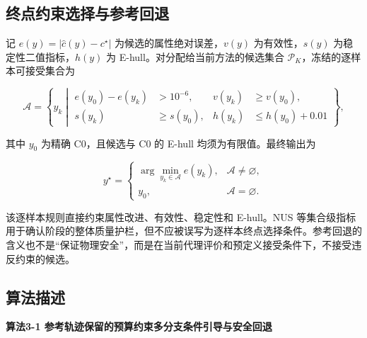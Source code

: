 \subsection{终点约束选择与参考回退}

记 \(e(y)=|\hat c(y)-c^{\star}|\) 为候选的属性绝对误差，\(v(y)\) 为有效性，\(s(y)\) 为稳定性二值指标，\(h(y)\) 为 E-hull。对分配给当前方法的候选集合 \(\mathcal P_K\)，冻结的逐样本可接受集合为

\[
\mathcal A=
\left\{y_k\middle|
\begin{aligned}
e(y_0)-e(y_k)&>10^{-6},&
v(y_k)&\ge v(y_0),\\
s(y_k)&\ge s(y_0),&
h(y_k)&\le h(y_0)+0.01
\end{aligned}
\right\},
\]

其中 \(y_0\) 为精确 C0，且候选与 C0 的 E-hull 均须为有限值。最终输出为

\[
y^{\star}=
\begin{cases}
\displaystyle\arg\min_{y_k\in\mathcal A}e(y_k), & \mathcal A\ne\varnothing,\\
y_0, & \mathcal A=\varnothing.
\end{cases}
\]

该逐样本规则直接约束属性改进、有效性、稳定性和 E-hull。NUS 等集合级指标用于确认阶段的整体质量护栏，但不应被误写为逐样本终点选择条件。参考回退的含义也不是``保证物理安全''，而是在当前代理评价和预定义接受条件下，不接受违反约束的候选。

\subsection{算法描述}

\textbf{算法3-1 参考轨迹保留的预算约束多分支条件引导与安全回退}

\begin{Shaded}
\begin{Highlighting}[]

\end{Highlighting}
\end{Shaded}

